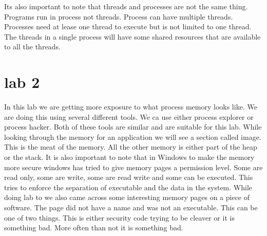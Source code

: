 \documentclass[letterpaper, onecolumn,10pt]{IEEEtran}
\begin{document}
		    Its also important to note that threads and processes are not the same thing. Programs run in process not threads. Process can have multiple threads. Processes need at lease one thread to execute but is not limited to one thread. The threads in a single process will have some shared resources that are available to all the threads.\\
		    
		    \section{lab 2}
		    In this lab we are getting more exposure to what process memory looks like. We are doing this using several different tools. We ca use either process explorer or process hacker. Both of these tools are similar and are suitable for this lab. While looking through the memory for an application we will see a section called image. This is the meat of the memory. All the other memory is either part of the heap or the stack. It is also important to note that in Windows to make the memory more secure windows has tried to give memory pages a permission level. Some are read only, some are write, some are read write and some can be executed. This tries to enforce the separation of executable and the data in the system. While doing lab to we also came across some interesting memory pages on a piece of software. The page did not have a name and was not an executable. This can be one of two things. This is either security code trying to be cleaver or it is something bad. More often than not it is something bad.\\
		    
		    
		    
		    
		    
		    
		
\end{document}
